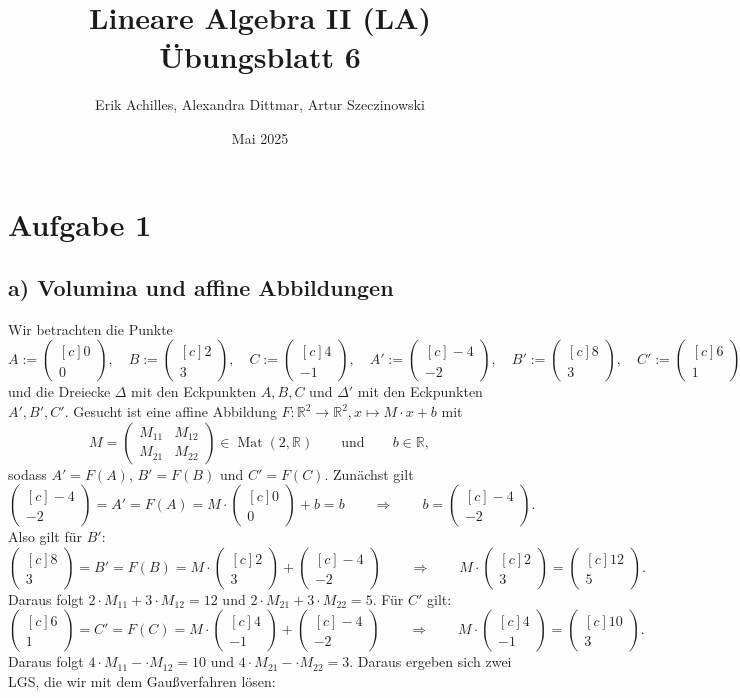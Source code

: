 \documentclass{article}
\title{Lineare Algebra II (LA) Übungsblatt 6}
\author{Erik Achilles, Alexandra Dittmar, Artur Szeczinowski}
\date{Mai 2025}
\newcommand{\RR}{\mathbb{R}}
\newcommand{\imp}{\mathbb{\Rightarrow}}
\DeclareMathOperator{\Mat}{Mat}
\newcommand{\vect}[1]{\begin{pmatrix*}[c] #1 \end{pmatrix*}}
\newcommand{\legs}[2]{\left(\begin{array}{#1}#2\end{array}\right)}
\begin{document}

\section*{Aufgabe 1}
\subsection*{a) Volumina und affine Abbildungen}

Wir betrachten die Punkte
\[
A := \vect{0\\0}, \quad
B := \vect{2\\3}, \quad
C := \vect{4\\-1}, \quad
A' := \vect{-4\\-2}, \quad
B' := \vect{8\\3}, \quad
C' := \vect{6\\1}
\in \RR^2.
\]
und die Dreiecke $\Delta$ mit den Eckpunkten
$A,B,C$ und $\Delta'$ mit den Eckpunkten
$A',B',C'$.
Gesucht ist eine affine Abbildung
$F: \RR^2 \to \RR^2, x \mapsto M \cdot x + b$
mit
\[
M = \legs{cc}{ M_{11} & M_{12} \\ M_{21} & M_{22} }
\in \Mat(2,\RR) \qquad\text{und}\qquad b \in \RR,
\]
sodass $A' = F(A)$, $B' = F(B)$ und $C' = F(C)$.
Zunächst gilt
\[
\vect{-4\\-2} = A' = F(A) = M \cdot \vect{0\\0} + b = b
\qquad\imp\qquad
b = \vect{-4\\-2}.
\]
Also gilt für $B'$:
\[
\vect{8\\3} = B' = F(B) = M \cdot \vect{2\\3} + \vect{-4\\-2}
\qquad\imp\qquad
M \cdot \vect{2\\3} = \vect{12\\5}.
\]
Daraus folgt
$2 \cdot M_{11} + 3 \cdot M_{12} = 12$
und
$2 \cdot M_{21} + 3 \cdot M_{22} = 5$.
Für $C'$ gilt:
\[
\vect{6\\1} = C' = F(C) = M \cdot \vect{4\\-1} + \vect{-4\\-2}
\qquad\imp\qquad
M \cdot \vect{4\\-1} = \vect{10\\3}.
\]
Daraus folgt
$4 \cdot M_{11} - \cdot M_{12} = 10$
und
$4 \cdot M_{21} - \cdot M_{22} = 3$.
Daraus ergeben sich zwei LGS, die wir mit dem Gaußverfahren lösen:
\end{document}
